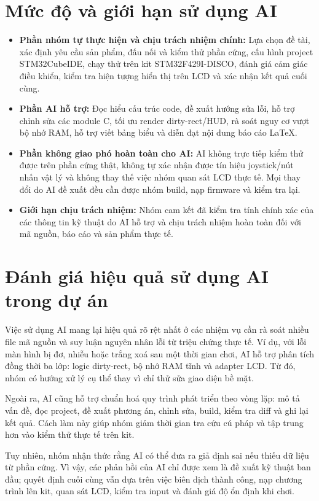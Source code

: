 \documentclass[a4paper,12pt]{report}
\begin{document}
\section{Mức độ và giới hạn sử dụng AI}

\begin{itemize}
    \item \textbf{Phần nhóm tự thực hiện và chịu trách nhiệm chính:} Lựa chọn đề tài, xác định yêu cầu sản phẩm, đấu nối và kiểm thử phần cứng, cấu hình project STM32CubeIDE, chạy thử trên kit STM32F429I-DISCO, đánh giá cảm giác điều khiển, kiểm tra hiện tượng hiển thị trên LCD và xác nhận kết quả cuối cùng.
    \item \textbf{Phần AI hỗ trợ:} Đọc hiểu cấu trúc code, đề xuất hướng sửa lỗi, hỗ trợ chỉnh sửa các module C, tối ưu render dirty-rect/HUD, rà soát nguy cơ vượt bộ nhớ RAM, hỗ trợ viết bảng biểu và diễn đạt nội dung báo cáo LaTeX.
    \item \textbf{Phần không giao phó hoàn toàn cho AI:} AI không trực tiếp kiểm thử được trên phần cứng thật, không tự xác nhận được tín hiệu joystick/nút nhấn vật lý và không thay thế việc nhóm quan sát LCD thực tế. Mọi thay đổi do AI đề xuất đều cần được nhóm build, nạp firmware và kiểm tra lại.
    \item \textbf{Giới hạn chịu trách nhiệm:} Nhóm cam kết đã kiểm tra tính chính xác của các thông tin kỹ thuật do AI hỗ trợ và chịu trách nhiệm hoàn toàn đối với mã nguồn, báo cáo và sản phẩm thực tế.
\end{itemize}

\section{Đánh giá hiệu quả sử dụng AI trong dự án}

Việc sử dụng AI mang lại hiệu quả rõ rệt nhất ở các nhiệm vụ cần rà soát nhiều file mã nguồn và suy luận nguyên nhân lỗi từ triệu chứng thực tế. Ví dụ, với lỗi màn hình bị đơ, nhiễu hoặc trắng xoá sau một thời gian chơi, AI hỗ trợ phân tích đồng thời ba lớp: logic dirty-rect, bộ nhớ RAM tĩnh và adapter LCD. Từ đó, nhóm có hướng xử lý cụ thể thay vì chỉ thử sửa giao diện bề mặt.

Ngoài ra, AI cũng hỗ trợ chuẩn hoá quy trình phát triển theo vòng lặp: mô tả vấn đề, đọc project, đề xuất phương án, chỉnh sửa, build, kiểm tra diff và ghi lại kết quả. Cách làm này giúp nhóm giảm thời gian tra cứu cú pháp và tập trung hơn vào kiểm thử thực tế trên kit.

Tuy nhiên, nhóm nhận thức rằng AI có thể đưa ra giả định sai nếu thiếu dữ liệu từ phần cứng. Vì vậy, các phản hồi của AI chỉ được xem là đề xuất kỹ thuật ban đầu; quyết định cuối cùng vẫn dựa trên việc biên dịch thành công, nạp chương trình lên kit, quan sát LCD, kiểm tra input và đánh giá độ ổn định khi chơi.

\end{document}
